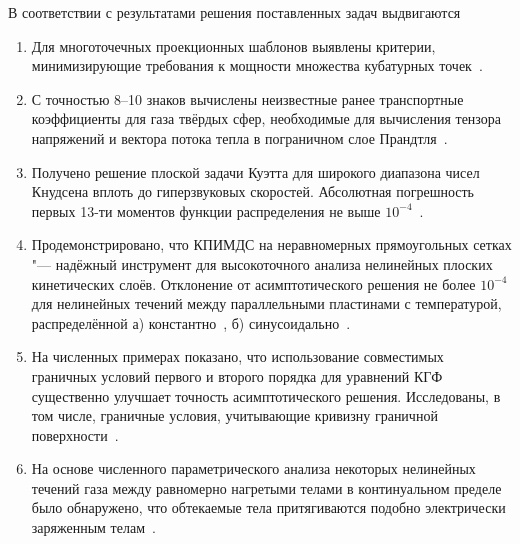 В соответствии с результатами решения поставленных задач выдвигаются {}
\begin{enumerate}
    \item\label{defpos:stencils}
    Для многоточечных проекционных шаблонов выявлены критерии,
    минимизирующие требования к мощности множества кубатурных точек~\cite{Rogozin2016}.
    \item\label{defpos:transport_coeffs}
    С точностью 8--10 знаков вычислены неизвестные ранее транспортные коэффициенты для газа твёрдых сфер,
    необходимые для вычисления тензора напряжений и вектора потока тепла в пограничном слое Прандтля~\cite{Rogozin2016}.
    \item\label{defpos:Couette_flow}
    Получено решение плоской задачи Куэтта для широкого диапазона чисел Кнудсена вплоть до гиперзвуковых скоростей.
    Абсолютная погрешность первых 13-ти моментов функции распределения не выше \(10^{-4}\)~\cite{Rogozin2016}.
    \item\label{defpos:asymptotic_verification}
    Продемонстрировано, что КПИМДС на неравномерных прямоугольных сетках "--- надёжный инструмент
    для высокоточного анализа нелинейных плоских кинетических слоёв. Отклонение от асимптотического
    решения не более \(10^{-4}\) для нелинейных течений между параллельными пластинами с температурой,
    распределённой а) константно~\cite{Rogozin2016}, б) синусоидально~\cite{Rogozin2017}.
    \item\label{defpos:boundary_conditions}
    На численных примерах показано, что использование совместимых граничных условий первого и второго порядка
    для уравнений КГФ существенно улучшает точность асимптотического решения.
    Исследованы, в том числе, граничные условия, учитывающие кривизну граничной поверхности~\cite{Rogozin2017}.
    \item\label{defpos:snit_forces}
    На основе численного параметрического анализа некоторых нелинейных течений газа
    между равномерно нагретыми телами в континуальном пределе было обнаружено,
    что обтекаемые тела притягиваются подобно электрически заряженным телам~\cite{Rogozin2014}.
\end{enumerate}

